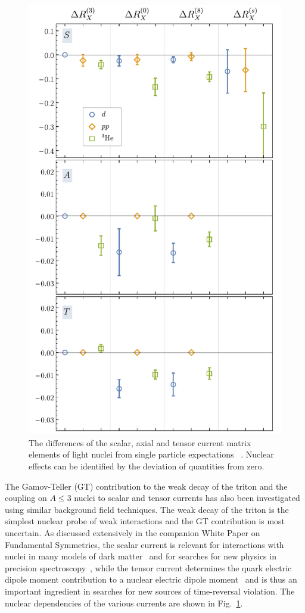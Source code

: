 %
\begin{figure}
	\vspace*{-0cm}
	\centering
	\includegraphics[width=0.4\columnwidth]{figures/RatioSummary.pdf}  
	\caption{ 
		The differences of the scalar, axial and tensor current matrix elements of light nuclei from single particle expectations ~\protect\cite{Beane:2015yha}. Nuclear effects can be identified by the deviation of quantities from zero.   
	}
	\label{fig:SAT}
	\vspace*{-1.5cm}
\end{figure}
%
The Gamov-Teller (GT) contribution to the weak decay of the triton \cite{Savage:2016kon} and the coupling on $A\le3$ nuclei to scalar and tensor currents \cite{Chang:2017eiq} has also been investigated using similar background field techniques. The weak decay of the triton is the simplest nuclear probe of weak interactions and the GT contribution is most uncertain. 
As discussed extensively in the companion White Paper on Fundamental Symmetries, the scalar current is relevant for interactions with nuclei in many models of dark matter~\cite{Undagoitia:2015gya} and for searches for new physics in precision spectroscopy~\cite{Delaunay:2016brc,Delaunay:2017dku}, while the tensor current determines 
the quark electric dipole moment contribution to a nuclear electric dipole moment~\cite{Engel:2013lsa,Yamanaka:2016umw,Chupp:2017rkp} and is thus an important ingredient in searches for new sources of time-reversal violation. 
 The nuclear dependencies of the various currents are shown in Fig.~\ref{fig:SAT}.


